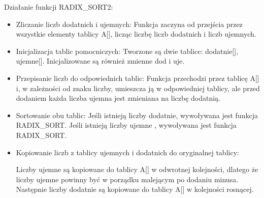 \documentclass{article}
\begin{document}
			Działanie funkcji RADIX\_SORT2:
			\begin{itemize}
				\item Zliczanie liczb dodatnich i ujemnych: Funkcja zaczyna od przejścia przez wszystkie elementy tablicy A[], licząc liczbę liczb dodatnich i liczb ujemnych.
				
				\item Inicjalizacja tablic pomocniczych:
				Tworzone są dwie tablice: dodatnie[], ujemne[]. 
				Inicjalizowane są również zmienne dod i uje.
				
				\item Przepisanie liczb do odpowiednich tablic:
				Funkcja przechodzi przez tablicę A[] i, w zależności od znaku liczby, umieszcza ją w odpowiedniej tablicy, ale przed dodaniem każda liczba ujemna jest zmieniana na liczbę dodatnią.
				
				\item Sortowanie obu tablic:
				Jeśli istnieją liczby dodatnie, wywoływana jest funkcja RADIX\_SORT.
				Jeśli istnieją liczby ujemne , wywoływana jest funkcja RADIX\_SORT.
				
				\item Kopiowanie liczb z tablicy ujemnych i dodatnich do oryginalnej tablicy:
				
				Liczby ujemne są kopiowane do tablicy A[] w odwrotnej kolejności, dlatego że liczby ujemne powinny być w porządku malejącym po dodaniu minusa. Następnie liczby dodatnie są kopiowane do tablicy A[] w kolejności rosnącej.
			\end{itemize}
			
\end{document}
